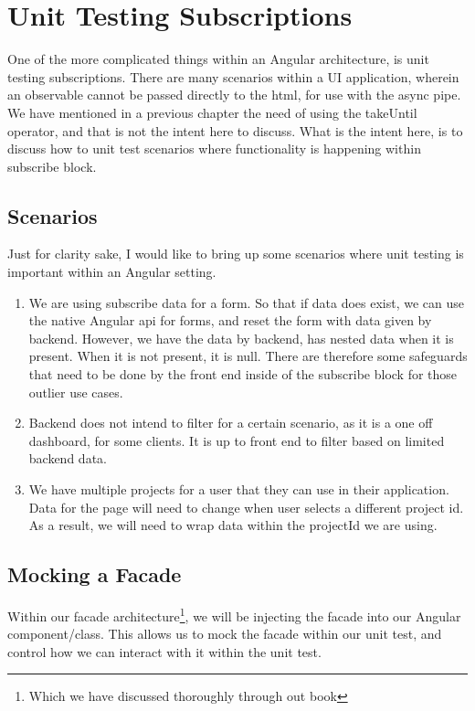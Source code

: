 \maketitle{}
\section{ Unit Testing Subscriptions }

One of the more complicated things within an Angular architecture, is unit
testing subscriptions. There are many scenarios within a UI application, wherein
an observable cannot be passed directly to the html, for use with the async pipe.
We have mentioned in a previous chapter the need of using the takeUntil operator,
and that is not the intent here to discuss. What is the intent here, is to
discuss how to unit test scenarios where functionality is happening within
subscribe block.

\subsection{Scenarios}
Just for clarity sake, I would like to bring up some scenarios where unit
testing is important within an Angular setting.
\begin{enumerate}
  \item We are using subscribe data for a form. So that if data does exist, we
  can use the native Angular api for forms, and reset the form with data
  given by backend. However, we have the data by backend, has nested data
  when it is present. When it is not present, it is null. There are therefore
  some safeguards that need to be done by the front end inside of the subscribe
  block for those outlier use cases.
  \item Backend does not intend to filter for a certain scenario, as it is a one
  off dashboard, for some clients. It is up to front end to filter based on
  limited backend data.
  \item We have multiple projects for a user that they can use in their
  application. Data for the page will need to change when user selects a
  different project id. As a result, we will need to wrap data within the
  projectId we are using. 
\end{enumerate}

\maketitle{}
\subsection{ Mocking a Facade }
Within our facade architecture\footnote{Which we have discussed thoroughly
through out book}, we will be injecting the facade into our Angular
component/class. This allows us to mock the facade within our unit test, and
control how we can interact with it within the unit test.
